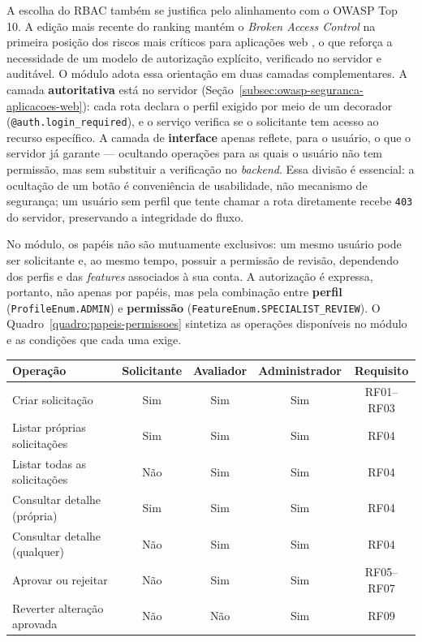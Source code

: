 A escolha do RBAC também se justifica pelo alinhamento com o OWASP Top 10. A edição mais
recente do ranking mantém o \textit{Broken Access Control} na primeira posição dos
riscos mais críticos para aplicações web \cite{owasp2025}, o que reforça a necessidade de
um modelo de autorização explícito, verificado no servidor e auditável. O módulo adota
essa orientação em duas camadas complementares. A camada \textbf{autoritativa} está no
servidor (Seção~\ref{subsec:owasp-seguranca-aplicacoes-web}): cada rota declara o perfil exigido por meio
de um decorador (\texttt{@auth.login\_required}), e o serviço verifica se o solicitante
tem acesso ao recurso específico. A camada de \textbf{interface} apenas reflete, para o
usuário, o que o servidor já garante — ocultando operações para as quais o usuário não
tem permissão, mas sem substituir a verificação no \textit{backend}. Essa divisão é
essencial: a ocultação de um botão é conveniência de usabilidade, não mecanismo de
segurança; um usuário sem perfil que tente chamar a rota diretamente recebe \texttt{403}
do servidor, preservando a integridade do fluxo.

No módulo, os papéis não são mutuamente exclusivos: um mesmo usuário pode ser
solicitante e, ao mesmo tempo, possuir a permissão de revisão, dependendo dos perfis e
das \textit{features} associados à sua conta. A autorização é expressa, portanto, não
apenas por papéis, mas pela combinação entre \textbf{perfil}
(\texttt{ProfileEnum.ADMIN}) e \textbf{permissão}
(\texttt{FeatureEnum.SPECIALIST\_REVIEW}). O Quadro~\ref{quadro:papeis-permissoes}
sintetiza as operações disponíveis no módulo e as condições que cada uma exige.

\begin{quadro}
\centering
\caption{Papéis e permissões no módulo de solicitações.}
\label{quadro:papeis-permissoes}
\begin{tabular}{lcccc}
\hline
\textbf{Operação} & \textbf{Solicitante} & \textbf{Avaliador} & \textbf{Administrador} & \textbf{Requisito} \\
\hline
Criar solicitação & Sim & Sim & Sim & RF01--RF03 \\
Listar próprias solicitações & Sim & Sim & Sim & RF04 \\
Listar todas as solicitações & Não & Sim & Sim & RF04 \\
Consultar detalhe (própria) & Sim & Sim & Sim & RF04 \\
Consultar detalhe (qualquer) & Não & Sim & Sim & RF04 \\
Aprovar ou rejeitar & Não & Sim & Sim & RF05--RF07 \\
Reverter alteração aprovada & Não & Não & Sim & RF09 \\
\hline
\end{tabular}
\end{quadro}

